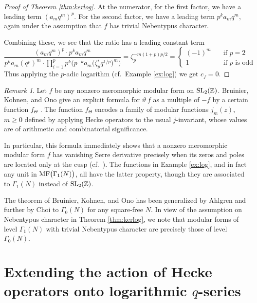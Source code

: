 \documentclass{gtpart}
\theoremstyle{definition}
\theoremstyle{remark}
\newtheorem{rmk}[thm]{Remark}
\newcommand{\mb}[1]{\mathbb{#1}}
\newcommand{\BZ}{{\mb Z}}
\newcommand{\MF}{{\rm MF}}
\newcommand{\G}{\Gamma}
\renewcommand{\=}{\approx}
\renewcommand{\-}{\sim}
\newcommand{\SL}{{\rm SL}}
\numberwithin{equation}{section}
\numberwithin{thm}{section}
\begin{document}
\begin{proof}[Proof of Theorem \ref{thm:kerlog}]
 At the numerator, for the first factor, we have a leading term $(a_m q^m)^p$.  
 For the second factor, we have a leading term $p^k a_m q^m$, again under the 
 assumption that $f$ has trivial Nebentypus character.  

 Combining these, we see that the ratio has a leading constant term 
 \[
  \frac{(a_m q^m)^p \cdot p^k a_m q^m}{p^k a_m (q^p)^m \cdot \prod_{i=1}^p p^k 
  \Big( p^{-k} a_m \big( \zeta_p^i q^{1/p} \big)^m \Big)} = 
  \zeta_p^{-m (1 + p) p / 2} = \left\{\!\!
  \begin{array}{cl}
    (-1)^m & \quad \text{if $p = 2$} \\
    1 & \quad \text{if $p$ is odd} 
  \end{array}
  \right.
 \]
 Thus applying the $p$-adic logarithm (cf.~Example \ref{ex:log}) we get 
 $c_f = 0$.  
\end{proof}

\begin{rmk}
 Let $f$ be any nonzero meromorphic modular form on $\SL_2(\BZ)$.  Bruinier, 
 Kohnen, and Ono give an explicit formula for $\vartheta ~\! f$ as a multiple of 
 $-f$ by a certain function $f_\Theta$ \cite[Theorem 1]{BKO}.  The function 
 $f_\Theta$ encodes a family of modular functions $j_m(z)$, $m \geq 0$ defined 
 by applying Hecke operators to the usual $j$-invariant, whose values are of 
 arithmetic and combinatorial significance.  

 In particular, this formula immediately shows that a nonzero meromorphic 
 modular form $f$ has vanishing Serre derivative precisely when its zeros and 
 poles are located only at the cusp (cf.~\cite[Proposition 6]{DumasRoyer}).  The 
 functions in Example \ref{ex:log}, and in fact any unit in 
 $\MF\big(\G_1(N)\big)$, all have the latter property, though they are 
 associated to $\G_1(N)$ instead of $\SL_2(\BZ)$.  

 The theorem of Bruinier, Kohnen, and Ono has been generalized by Ahlgren 
 \cite[Theorem 2]{Ahlgren} and further by Choi \cite[Theorem 3.4]{Choi} to 
 $\G_0(N)$ for any square-free $N$.  In view of the assumption on Nebentypus 
 character in Theorem \ref{thm:kerlog}, we note that modular forms of level 
 $\G_1(N)$ with trivial Nebentypus character are precisely those of level 
 $\G_0(N)$.  
\end{rmk}



\section{Extending the action of Hecke operators onto logarithmic $q$-series}
\label{sec:logq}
\end{document}
